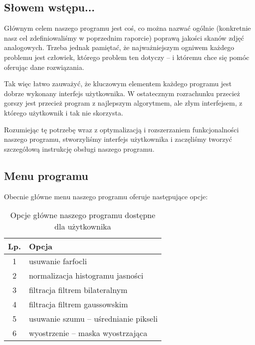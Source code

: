 \documentclass[]{mwart}
\begin{document}
\subsection{Słowem wstępu...}
Głównym celem naszego programu jest coś, co można nazwać
ogólnie (konkretnie nasz cel zdefiniowaliśmy w poprzednim raporcie)
poprawą jakości skanów zdjęć analogowych. Trzeba jednak pamiętać,
że najważniejszym ogniwem każdego problemu jest człowiek, którego
problem ten dotyczy -- i któremu chce się pomóc oferując dane rozwiązania. \newline

Tak więc łatwo zauważyć, że kluczowym elementem każdego programu jest dobrze wykonany
interfejs użytkownika. W ostatecznym rozrachunku przecież gorszy
jest przecież program z najlepszym algorytmem, ale złym interfejsem, z którego użytkownik i tak nie skorzysta. \newline


Rozumiejąc tę potrzebę wraz z optymalizacją i rozszerzaniem funkcjonalności
naszego programu, stworzyliśmy interfejs użytkownika i zaczęliśmy %
tworzyć szczegółową instrukcję obsługi naszego programu.

\subsection{Menu programu}
Obecnie główne menu naszego programu oferuje następujące opcje:

\begin{table}[h]
    \centering
    \begin{tabular}{|c|l|}
        \hline
        Lp. & Opcja                                 \\ \hline
        1   & usuwanie farfocli                     \\ \hline       %
        2   & normalizacja histogramu jasności      \\ \hline       %
        3   & filtracja filtrem bilateralnym        \\ \hline       %
        4   & filtracja filtrem gaussowskim         \\ \hline       %
        5   & usuwanie szumu -- uśrednianie pikseli \\ \hline       %
        6   & wyostrzenie -- maska wyostrzająca     \\ \hline       %
    \end{tabular}
    \caption{Opcje główne naszego programu dostępne dla użytkownika}
\end{table}
\end{document}
